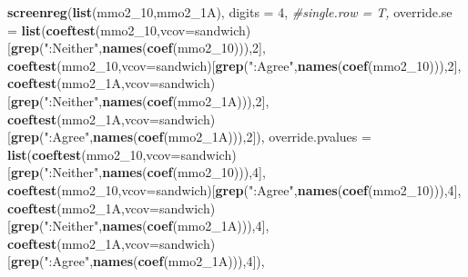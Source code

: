 \documentclass[
]{article}
\newenvironment{Shaded}{\begin{snugshade}}{\end{snugshade}}
\newcommand{\CommentTok}[1]{\textcolor[rgb]{0.56,0.35,0.01}{\textit{#1}}}
\newcommand{\DataTypeTok}[1]{\textcolor[rgb]{0.13,0.29,0.53}{#1}}
\newcommand{\DecValTok}[1]{\textcolor[rgb]{0.00,0.00,0.81}{#1}}
\newcommand{\KeywordTok}[1]{\textcolor[rgb]{0.13,0.29,0.53}{\textbf{#1}}}
\newcommand{\NormalTok}[1]{#1}
\newcommand{\StringTok}[1]{\textcolor[rgb]{0.31,0.60,0.02}{#1}}
\begin{document}
\begin{Shaded}
\begin{Highlighting}[]
\KeywordTok{screenreg}\NormalTok{(}\KeywordTok{list}\NormalTok{(mmo2_}\DecValTok{10}\NormalTok{,mmo2_1A), }\DataTypeTok{digits =} \DecValTok{4}\NormalTok{, }\CommentTok{#single.row = T,}
          \DataTypeTok{override.se =} \KeywordTok{list}\NormalTok{(}\KeywordTok{coeftest}\NormalTok{(mmo2_}\DecValTok{10}\NormalTok{,}\DataTypeTok{vcov=}\NormalTok{sandwich)[}\KeywordTok{grep}\NormalTok{(}\StringTok{":Neither"}\NormalTok{,}\KeywordTok{names}\NormalTok{(}\KeywordTok{coef}\NormalTok{(mmo2_}\DecValTok{10}\NormalTok{))),}\DecValTok{2}\NormalTok{],}
                             \KeywordTok{coeftest}\NormalTok{(mmo2_}\DecValTok{10}\NormalTok{,}\DataTypeTok{vcov=}\NormalTok{sandwich)[}\KeywordTok{grep}\NormalTok{(}\StringTok{":Agree"}\NormalTok{,}\KeywordTok{names}\NormalTok{(}\KeywordTok{coef}\NormalTok{(mmo2_}\DecValTok{10}\NormalTok{))),}\DecValTok{2}\NormalTok{],}
                             \KeywordTok{coeftest}\NormalTok{(mmo2_1A,}\DataTypeTok{vcov=}\NormalTok{sandwich)[}\KeywordTok{grep}\NormalTok{(}\StringTok{":Neither"}\NormalTok{,}\KeywordTok{names}\NormalTok{(}\KeywordTok{coef}\NormalTok{(mmo2_1A))),}\DecValTok{2}\NormalTok{],}
                             \KeywordTok{coeftest}\NormalTok{(mmo2_1A,}\DataTypeTok{vcov=}\NormalTok{sandwich)[}\KeywordTok{grep}\NormalTok{(}\StringTok{":Agree"}\NormalTok{,}\KeywordTok{names}\NormalTok{(}\KeywordTok{coef}\NormalTok{(mmo2_1A))),}\DecValTok{2}\NormalTok{]),}
          \DataTypeTok{override.pvalues =} \KeywordTok{list}\NormalTok{(}\KeywordTok{coeftest}\NormalTok{(mmo2_}\DecValTok{10}\NormalTok{,}\DataTypeTok{vcov=}\NormalTok{sandwich)[}\KeywordTok{grep}\NormalTok{(}\StringTok{":Neither"}\NormalTok{,}\KeywordTok{names}\NormalTok{(}\KeywordTok{coef}\NormalTok{(mmo2_}\DecValTok{10}\NormalTok{))),}\DecValTok{4}\NormalTok{],}
                                  \KeywordTok{coeftest}\NormalTok{(mmo2_}\DecValTok{10}\NormalTok{,}\DataTypeTok{vcov=}\NormalTok{sandwich)[}\KeywordTok{grep}\NormalTok{(}\StringTok{":Agree"}\NormalTok{,}\KeywordTok{names}\NormalTok{(}\KeywordTok{coef}\NormalTok{(mmo2_}\DecValTok{10}\NormalTok{))),}\DecValTok{4}\NormalTok{],}
                                  \KeywordTok{coeftest}\NormalTok{(mmo2_1A,}\DataTypeTok{vcov=}\NormalTok{sandwich)[}\KeywordTok{grep}\NormalTok{(}\StringTok{":Neither"}\NormalTok{,}\KeywordTok{names}\NormalTok{(}\KeywordTok{coef}\NormalTok{(mmo2_1A))),}\DecValTok{4}\NormalTok{],}
                                  \KeywordTok{coeftest}\NormalTok{(mmo2_1A,}\DataTypeTok{vcov=}\NormalTok{sandwich)[}\KeywordTok{grep}\NormalTok{(}\StringTok{":Agree"}\NormalTok{,}\KeywordTok{names}\NormalTok{(}\KeywordTok{coef}\NormalTok{(mmo2_1A))),}\DecValTok{4}\NormalTok{]),}

\end{Highlighting}
\end{Shaded}
\end{document}

